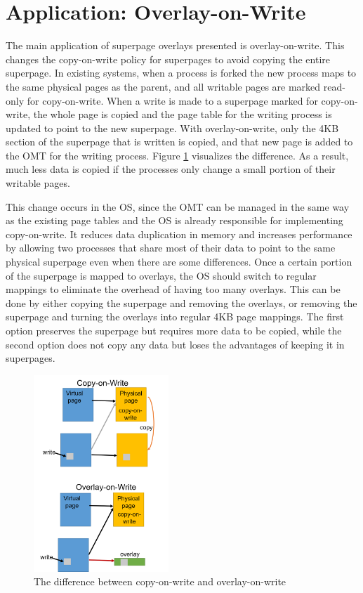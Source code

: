 \section{Application: Overlay-on-Write}
The main application of superpage overlays presented is overlay-on-write. This changes the copy-on-write policy for superpages to avoid copying the entire superpage. In existing systems, when a process is forked the new process maps to the same physical pages as the parent, and all writable pages are marked read-only for copy-on-write. When a write is made to a superpage marked for copy-on-write, the whole page is copied and the page table for the writing process is updated to point to the new superpage. With overlay-on-write, only the 4KB section of the superpage that is written is copied, and that new page is added to the OMT for the writing process. Figure \ref{fig:oow} visualizes the difference. As a result, much less data is copied if the processes only change a small portion of their writable pages.

This change occurs in the OS, since the OMT can be managed in the same way as the existing page tables and the OS is already responsible for implementing copy-on-write. It reduces data duplication in memory and increases performance by allowing two processes that share most of their data to point to the same physical superpage even when there are some differences. Once a certain portion of the superpage is mapped to overlays, the OS should switch to regular mappings to eliminate the overhead of having too many overlays. This can be done by either copying the superpage and removing the overlays, or removing the superpage and turning the overlays into regular 4KB page mappings. The first option preserves the superpage but requires more data to be copied, while the second option does not copy any data but loses the advantages of keeping it in superpages.
\begin{figure}
    \centering
    \includegraphics[width=2in]{Figures/Picture2}
    \caption{The difference between copy-on-write and overlay-on-write}
    \label{fig:oow}
\end{figure}
